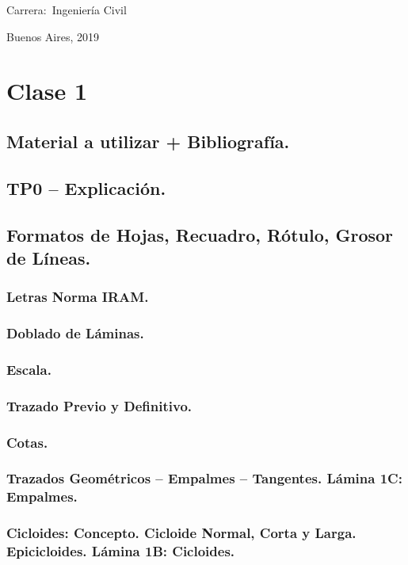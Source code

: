 \documentclass[12pt]{book}
\begin{document}
\noindent Carrera:\,	Ingeniería Civil

\vspace{1cm}

\vspace{1cm}

\noindent Buenos Aires, 2019

\newpage


\tableofcontents

\chapter{Clase 1}
\section{Material a utilizar + Bibliografía.}
\section{TP0 – Explicación.}
\section{Formatos de Hojas, Recuadro, Rótulo, Grosor de Líneas.}
\subsection{Letras Norma IRAM.}
\subsection{Doblado de Láminas.}
\subsection{Escala.}
\subsection{Trazado Previo y Definitivo.}
\subsection{Cotas.}
\subsection{Trazados Geométricos – Empalmes – Tangentes. Lámina 1C: Empalmes.}
\subsection{Cicloides: Concepto. Cicloide Normal, Corta y Larga. Epicicloides. Lámina 1B: Cicloides.}
\end{document}
